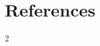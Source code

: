 \documentclass[11pt]{article}
\begin{document}











\nolinenumbers
\section*{References}
\renewcommand{\bibsection}{}
\begin{multicols}{2}
\renewcommand{\bibfont}{\scriptsize}
\setlength{\bibsep}{0pt plus 0.2ex}

\end{multicols}
\end{document}
